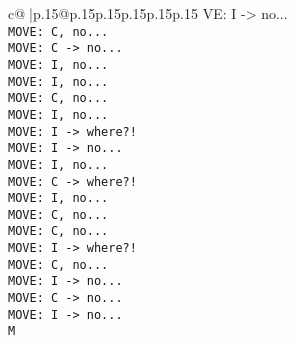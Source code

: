 \documentclass{article}
\begin{document}
{\begin{supertabular}{c@{$\;$}|p{.15\linewidth}@{}p{.15\linewidth}p{.15\linewidth}p{.15\linewidth}p{.15\linewidth}p{.15\linewidth}}
{{{VE: I -> no...\\ \tt  MOVE: C, no...\\ \tt  MOVE: C -> no...\\ \tt  MOVE: I, no...\\ \tt  MOVE: I, no...\\ \tt  MOVE: C, no...\\ \tt  MOVE: I, no...\\ \tt  MOVE: I -> where?!\\ \tt  MOVE: I -> no...\\ \tt  MOVE: I, no...\\ \tt  MOVE: C -> where?!\\ \tt  MOVE: I, no...\\ \tt  MOVE: C, no...\\ \tt  MOVE: C, no...\\ \tt  MOVE: I -> where?!\\ \tt  MOVE: C, no...\\ \tt  MOVE: I -> no...\\ \tt  MOVE: C -> no...\\ \tt  MOVE: I -> no...\\ \tt  M}}}
\end{supertabular}}
\end{document}
